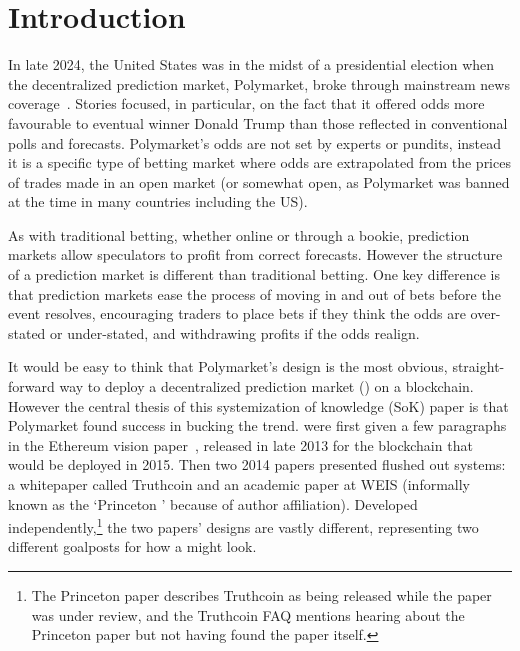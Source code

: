 \section{Introduction}

In late 2024, the United States was in the midst of a presidential election when the decentralized prediction market, Polymarket, broke through mainstream news coverage~\cite{YBG24,Cha24}. Stories focused, in particular, on the fact that it offered odds more favourable to eventual winner Donald Trump than those reflected in conventional polls and forecasts. Polymarket's odds are not set by experts or pundits, instead it is a specific type of betting market where odds are extrapolated from the prices of trades made in an open market (or somewhat open, as Polymarket was banned at the time in many countries including the US). 

As with traditional betting, whether online or through a bookie, prediction markets allow speculators to profit from correct forecasts. However the structure of a prediction market is different than traditional betting. One key difference is that prediction markets ease the process of moving in and out of bets before the event resolves, encouraging traders to place bets if they think the odds are over-stated or under-stated, and withdrawing profits if the odds realign.

It would be easy to think that Polymarket's design is the most obvious, straight-forward way to deploy a decentralized prediction market (\depm) on a blockchain. However the central thesis of this systemization of knowledge (SoK) paper is that Polymarket found success in bucking the trend. \depms were first given a few paragraphs in the Ethereum vision paper~\cite{But13}, released in late 2013 for the blockchain that would be deployed in 2015. Then two 2014 papers presented flushed out systems: a whitepaper called Truthcoin and an academic paper at WEIS (informally known as the `Princeton \depm' because of author affiliation). Developed independently,\footnote{The Princeton paper describes Truthcoin as being released while the paper was under review, and the Truthcoin FAQ mentions hearing about the Princeton paper but not having found the paper itself.} the two papers' designs are vastly different, representing two different goalposts for how a \depm might look. 

